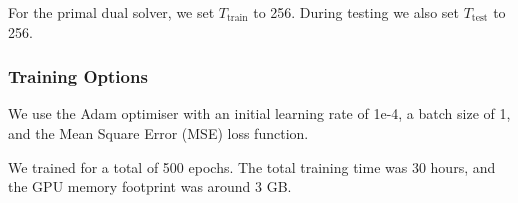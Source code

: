 \documentclass[12pt]{article}
\begin{document}











For the primal dual solver, we set 
$T_{\text{train}}$ to 256.
During testing we also set $T_{\text{test}}$ to 256.



\subsubsection{Training Options}

We use the Adam optimiser with an initial learning rate of 1e-4, a batch size of 1, and the Mean Square Error (MSE) loss function. 

We trained for a total of 500 epochs. The total training time was 30 hours, and the GPU memory footprint was around 3 GB.
\end{document}
